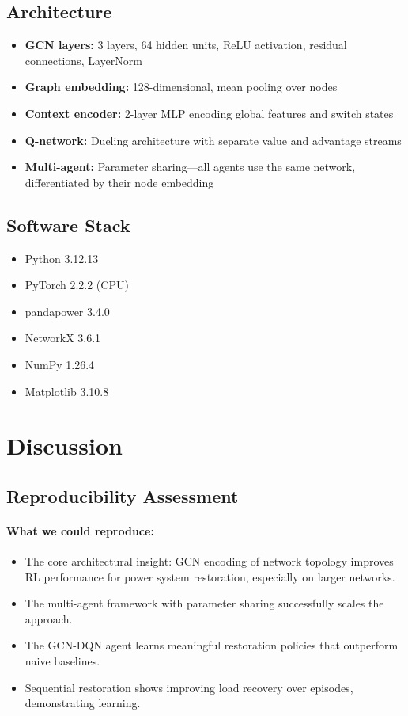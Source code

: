 \documentclass[11pt]{article}
\begin{document}
\subsection{Architecture}
\begin{itemize}[leftmargin=*]
    \item \textbf{GCN layers:} 3 layers, 64 hidden units, ReLU activation, residual connections, LayerNorm
    \item \textbf{Graph embedding:} 128-dimensional, mean pooling over nodes
    \item \textbf{Context encoder:} 2-layer MLP encoding global features and switch states
    \item \textbf{Q-network:} Dueling architecture with separate value and advantage streams
    \item \textbf{Multi-agent:} Parameter sharing---all agents use the same network, differentiated by their node embedding
\end{itemize}

\subsection{Software Stack}
\begin{itemize}[leftmargin=*]
    \item Python 3.12.13
    \item PyTorch 2.2.2 (CPU)
    \item pandapower 3.4.0
    \item NetworkX 3.6.1
    \item NumPy 1.26.4
    \item Matplotlib 3.10.8
\end{itemize}

\section{Discussion}

\subsection{Reproducibility Assessment}

\paragraph{What we could reproduce:}
\begin{itemize}[leftmargin=*]
    \item The core architectural insight: GCN encoding of network topology improves RL performance for power system restoration, especially on larger networks.
    \item The multi-agent framework with parameter sharing successfully scales the approach.
    \item The GCN-DQN agent learns meaningful restoration policies that outperform naive baselines.
    \item Sequential restoration shows improving load recovery over episodes, demonstrating learning.
\end{itemize}
\end{document}
